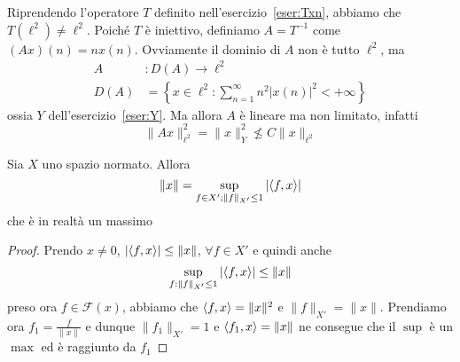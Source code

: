 Riprendendo l'operatore \(T\) definito nell'esercizio~\ref{eser:Txn}, abbiamo
che \(T{(\ell^2)} \neq \ell^2\). Poiché \(T\) è iniettivo, definiamo \(A = T^{-1}\) come \({(Ax)}{(n)} = nx{(n)}\). Ovviamente il dominio di \(A\) non è tutto \(\ell^2\), ma
\begin{align*}
    A&: D{(A)} \longrightarrow \ell^2 \\
    D{(A)} &= \left\{ x \in \ell^2 : \sum_{n=1}^{\infty} n^2 | x{(n)}|^2 < +\infty  \right\} 
\end{align*}
ossia \(Y\) dell'esercizio~\ref{eser:Y}. Ma allora \(A\) è lineare ma non
limitato, infatti
\[
  \|Ax\|^2_{\ell^2} = \|x\|^2_Y \not \le  C \|x\|_{\ell^2} 
\]
\begin{corollary}{}
    Sia \(X\) uno spazio normato. Allora
    \[
      \|x\| = \sup_{f \in X' ; \|f\|_{X'} \le 1 } |{\left\langle f, x\right\rangle}|
    \]
    che è in realtà un massimo
\end{corollary}
\begin{proof}{}
    Prendo \(x\neq 0\), \(|{\left\langle f, x\right\rangle} | \le  \|x\|\), \(\forall f \in X'\) e
    quindi anche
    \[
      \sup_{f : \|f\|_{X'} \le 1 } |{\left\langle f, x\right\rangle} | \le  \|x\|
    \]
    preso ora \(
    f \in \mathcal{F}{(x)}\), abbiamo che \({\left\langle f, x\right\rangle} = \|x\|^2\) e \(\|f\|_{X'} = \|x\|\). Prendiamo ora \(f_{1} = \frac{f}{\|x\|}\) e dunque \(\|f_{1}\|_{X'} = 1\) e \({\left\langle f_{1}, x\right\rangle} = \|x\| \) 
    ne consegue che il \(\sup\) è un \(\max\) ed è raggiunto da \(f_{1}\) 
\end{proof}


